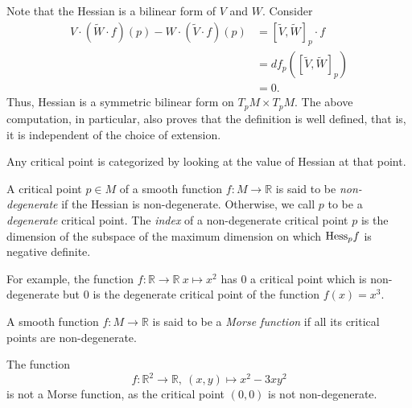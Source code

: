 \bigskip

\noindent Note that the Hessian is a bilinear form of $V$ and $W$. Consider
\begin{align*}
    V\cdot \left(\tilde{W}\cdot f\right)(p) - W\cdot \left(\tilde{V}\cdot f\right)(p)  & = \left[\tilde{V}, \tilde{W}\right]_p\cdot f \\
    & = df_p \left(\left[\tilde{V},\tilde{W}\right]_p\right) \\
    & = 0.
\end{align*}
Thus, Hessian is a symmetric bilinear form on $T_pM\times T_pM$. The above computation, in particular, also proves that the definition is well defined, that is, it is  independent of the choice of extension. 

\bigskip 

\hf Any critical point is categorized by looking at the value of Hessian at that point.

\begin{defn}\label{defn:nonDegenerateCriticalPoints} 
    A critical point $p\in M$ of a smooth function $f:M\to \mathbb{R}$ is said to be \emph{non-degenerate} if the Hessian is non-degenerate. Otherwise, we call $p$ to be a \emph{degenerate} critical point.  The \emph{index} of a non-degenerate critical point $p$ is the dimension of the subspace of the maximum dimension on which $\mathrm{Hess}_pf$ is negative definite.
\end{defn}

\bigskip

\noindent For example, the function $f:\mathbb{R}\to \mathbb{R} ~x\mapsto x^2$ has $0$ a critical point which is non-degenerate but $0$ is the degenerate critical point of the function $f(x)=x^3$.

\begin{defn}\label{defn:MorseFunction}
    A smooth function $f:M\to \mathbb{R}$ is said to be a \textit{Morse function}  if all its critical points are non-degenerate.
\end{defn}

\begin{eg}
    The function 
    \begin{displaymath}
        f:\mathbb{R}^2\to \mathbb{R},~(x,y) \mapsto x^2-3xy^2
    \end{displaymath}
    is not a Morse function, as the critical point $(0,0)$ is not non-degenerate.
\end{eg}

